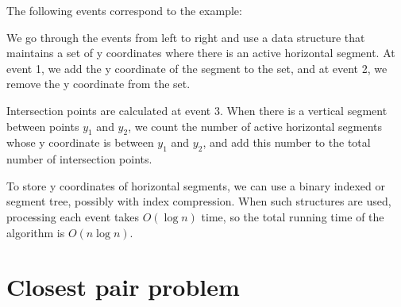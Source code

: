The following events correspond to the example:
\begin{center}
\end{center}

We go through the events from left to right
and use a data structure that maintains a set of
y coordinates where there is an active horizontal segment.
At event 1, we add the y coordinate of the segment
to the set, and at event 2, we remove the
y coordinate from the set.

Intersection points are calculated at event 3.
When there is a vertical segment between points
$y_1$ and $y_2$, we count the number of active
horizontal segments whose y coordinate is between
$y_1$ and $y_2$, and add this number to the total
number of intersection points.

To store y coordinates of horizontal segments,
we can use a binary indexed or segment tree,
possibly with index compression.
When such structures are used, processing each event
takes $O(\log n)$ time, so the total running
time of the algorithm is $O(n \log n)$.

\section{Closest pair problem}


